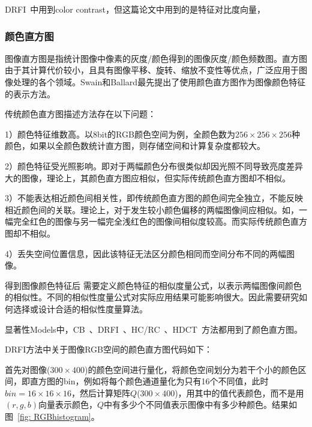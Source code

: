 \documentclass[12pt]{article}
\begin{document}
DRFI~\cite{jianghuaizu2013salient}中用到color contrast，但这篇论文中用到的是特征对比度向量，

\subsubsection{颜色直方图}

图像直方图是指统计图像中像素的灰度/颜色得到的图像灰度/颜色频数图。直方图由于其计算代价较小，且具有图像平移、旋转、缩放不变性等优点，广泛应用于图像处理的各个领域。Swain和Ballard最先提出了使用颜色直方图作为图像颜色特征的表示方法。

传统颜色直方图描述方法存在以下问题：

1）颜色特征维数高。以8bit的RGB颜色空间为例，全颜色数为$256 \times 256 \times 256$种颜色，如果以全颜色数统计直方图，则存储空间和计算复杂度都较大。

2）颜色特征受光照影响。即对于两幅颜色分布很类似却因光照不同导致亮度差异大的图像，理论上，其颜色直方图应相似，但实际传统颜色直方图却不相似。

3）不能表达相近颜色间相关性，即传统颜色直方图的颜色间完全独立，不能反映相近颜色间的关联。理论上，对于发生较小颜色偏移的两幅图像间应相似。如，一幅完全红色的图像与另一幅完全浅红色的图像间相似度较高。而实际传统颜色直方图却不相似。

4）丢失空间位置信息，因此该特征无法区分颜色相同而空间分布不同的两幅图像。

得到图像颜色特征后 需要定义颜色特征的相似度量公式，以表示两幅图像间颜色的相似性。不同的相似性度量公式对实际应用结果可能影响很大。因此需要研究如何选择或设计合适的相似性度量算法。

显著性Models中，CB~\cite{jiang2011automatic}、DRFI~\cite{jianghuaizu2013salient}、HC/RC~\cite{cheng2011global}、HDCT~\cite{kim2014salient}方法都用到了颜色直方图。

DRFI方法中关于图像RGB空间的颜色直方图代码如下：



首先对图像($300 \times 400$)的颜色空间进行量化，将颜色空间划分为若干个小的颜色区间，即直方图的bin，例如将每个颜色通道量化为只有16个不同值，此时$bin = 16 \times 16 \times 16$，然后计算矩阵$Q$($300 \times 400$)，用其中的值代表颜色，而不是用$(r, g, b)$向量表示颜色，$Q$中有多少个不同值表示图像中有多少种颜色。结果如图~\ref{fig: RGBhistogram}。
\end{document}
